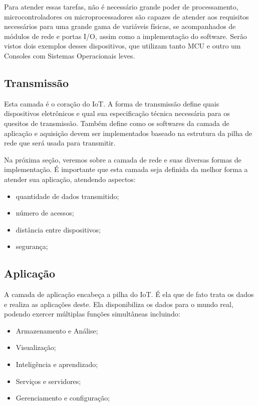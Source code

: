 Para atender essas tarefas, não é necessário grande poder de processamento, microcontroladores ou microprocessadores são capazes de atender aos requisitos necessários para uma grande gama de variáveis físicas, se acompanhados de módulos de rede e portas I/O, assim como a implementação do software. Serão vistos dois exemplos desses dispositivos, que utilizam tanto MCU  e outro um Consoles com Sistemas Operacionais leves.
 

\subsection{Transmissão}
\label{subsection:transmicao}

Esta camada é o coração do IoT. A forma de transmissão define quais dispositivos eletrônicos e qual sua especificação técnica necessária para os quesitos de transmissão. Também define como os softwares da camada de aplicação e aquisição devem ser implementados baseado na estrutura da pilha de rede que será usada para transmitir.

Na próxima seção, veremos sobre a camada de rede e suas diversas formas de implementação. É importante que esta camada seja definida da melhor forma a atender sua aplicação, atendendo aspectos: 
\begin{itemize}
\item quantidade de dados transmitido;
\item número de acessos; 
\item distância entre dispositivos;
\item segurança;
\end{itemize}

\subsection{Aplicação}
\label{subsection:aplicacao}

A camada de aplicação encabeça a pilha do IoT. É ela que de fato trata os dados e realiza as aplicações deste. Ela disponibiliza os dados para o mundo real, podendo exercer múltiplas funções simultâneas incluindo:

\begin{itemize}
\item Armazenamento e Análise;
\item Visualização; 
\item Inteligência e aprendizado;
\item Serviços e servidores;
\item Gerenciamento e configuração;
\end{itemize}

